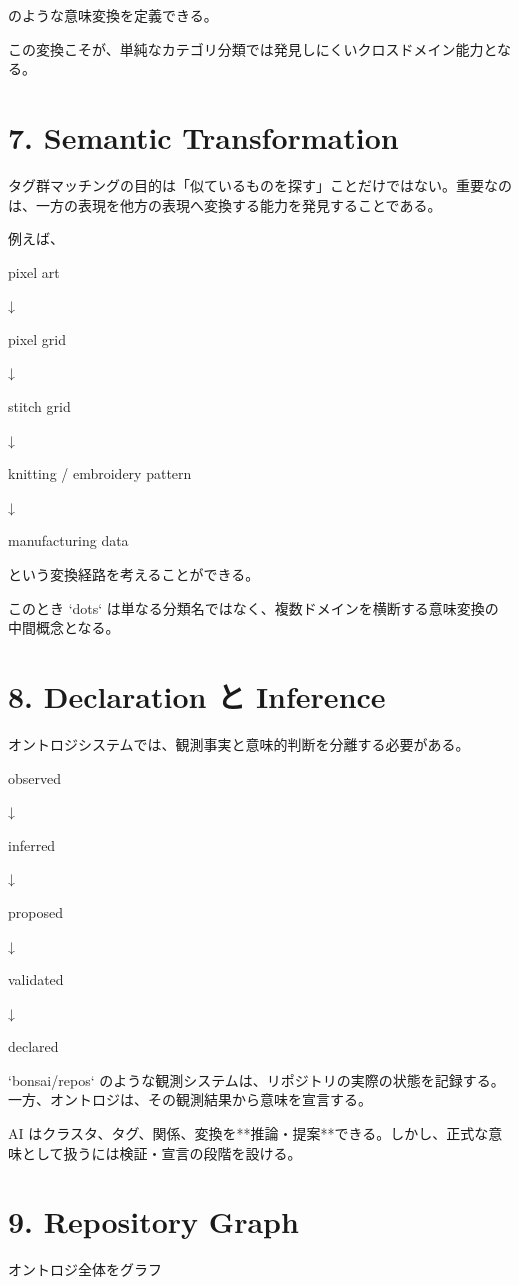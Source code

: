 \documentclass[a4paper,11pt]{jsarticle}
\begin{document}
のような意味変換を定義できる。


この変換こそが、単純なカテゴリ分類では発見しにくいクロスドメイン能力となる。


\section{7. Semantic Transformation}
タグ群マッチングの目的は「似ているものを探す」ことだけではない。重要なのは、一方の表現を他方の表現へ変換する能力を発見することである。


例えば、


pixel art


    ↓


pixel grid


    ↓


stitch grid


    ↓


knitting / embroidery pattern


    ↓


manufacturing data


という変換経路を考えることができる。


このとき `dots` は単なる分類名ではなく、複数ドメインを横断する意味変換の中間概念となる。


\section{8. Declaration と Inference}
オントロジシステムでは、観測事実と意味的判断を分離する必要がある。


observed


   ↓


inferred


   ↓


proposed


   ↓


validated


   ↓


declared


`bonsai/repos` のような観測システムは、リポジトリの実際の状態を記録する。一方、オントロジは、その観測結果から意味を宣言する。


AI はクラスタ、タグ、関係、変換を**推論・提案**できる。しかし、正式な意味として扱うには検証・宣言の段階を設ける。


\section{9. Repository Graph}
オントロジ全体をグラフ
\end{document}
